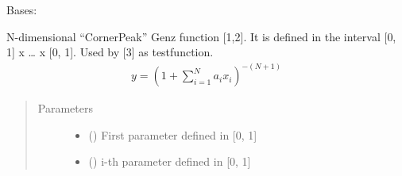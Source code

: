 \documentclass[letterpaper,10pt,english,openany,oneside]{sphinxmanual}
\begin{document}

\begin{fulllineitems}
\label{\detokenize{pygpc.testfunctions:pygpc.testfunctions.testfunctions.GenzCornerPeak}}
Bases: {\hyperref[\detokenize{pygpc:pygpc.AbstractModel.AbstractModel}]{}}

N-dimensional “CornerPeak” Genz function {[}1,2{]}. It is defined in the interval {[}0, 1{]} x … x {[}0, 1{]}.
Used by {[}3{]} as testfunction.
\begin{equation*}
\begin{split}y = \left( 1 + \sum_{i=1}^N a_i x_i\right)^{-(N + 1)}\end{split}
\end{equation*}\begin{quote}\begin{description}
\item[{Parameters}] \leavevmode\begin{itemize}
\item {} 
\sphinxstyleliteralstrong{\sphinxupquote{{[}}}\sphinxstyleliteralstrong{\sphinxupquote{{]}}} (\sphinxstyleliteralemphasis{\sphinxupquote{ {[}}}\sphinxstyleliteralemphasis{\sphinxupquote{{]}}}) \textendash{} First parameter defined in {[}0, 1{]}

\item {} 
\sphinxstyleliteralstrong{\sphinxupquote{{[}}}\sphinxstyleliteralstrong{\sphinxupquote{{]}}} (\sphinxstyleliteralemphasis{\sphinxupquote{ {[}}}\sphinxstyleliteralemphasis{\sphinxupquote{{]}}}) \textendash{} i-th parameter defined in {[}0, 1{]}


\end{itemize}
\end{description}
\end{quote}
\end{fulllineitems}
\end{document}

